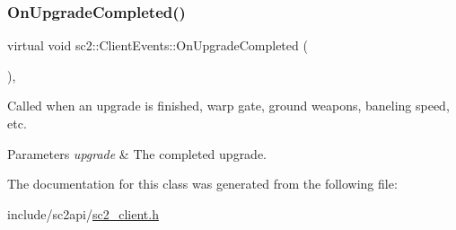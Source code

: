 \subsubsection{\texorpdfstring{On\+Upgrade\+Completed()}{OnUpgradeCompleted()}}
{\footnotesize\ttfamily virtual void sc2\+::\+Client\+Events\+::\+On\+Upgrade\+Completed (\begin{DoxyParamCaption}\item[{\hyperlink{classsc2_1_1_s_c2_type}{Upgrade\+ID}}]{ }\end{DoxyParamCaption})\hspace{0.3cm}{\ttfamily [inline]}, {\ttfamily [virtual]}}

Called when an upgrade is finished, warp gate, ground weapons, baneling speed, etc. 
\begin{DoxyParams}{Parameters}
{\em upgrade} & The completed upgrade. \\
\hline
\end{DoxyParams}


The documentation for this class was generated from the following file\+:\begin{DoxyCompactItemize}
\item 
include/sc2api/\hyperlink{sc2__client_8h}{sc2\+\_\+client.\+h}\end{DoxyCompactItemize}
